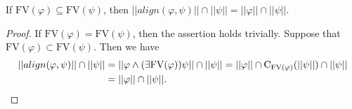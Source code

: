 \documentclass{lmcs}
\def\C{\textrm{C}}
\def\al{align}
\def\FV{\textrm{FV}}
\begin{document}
\begin{lem}\label{lem:align}
If $\FV(\varphi)\subseteq\FV(\psi)$, then  $||\al(\varphi,\psi)||\cap||\psi||=||\varphi||\cap||\psi||$.
\end{lem}
\begin{proof}
If $\FV(\varphi)=\FV(\psi)$, then the assertion holds trivially.
Suppose that $\FV(\varphi)\subset \FV(\psi)$. Then we have
\begin{align*}
||\al(\varphi,\psi)||\cap||\psi||&=||\varphi\wedge(\exists \FV(\varphi))\psi||\cap||\psi||=||\varphi||\cap\C_{\FV(\varphi)}(||\psi||)\cap||\psi||\\
&=||\varphi||\cap||\psi||.  \qedhere
\end{align*} 
 
\end{proof}
\end{document}
